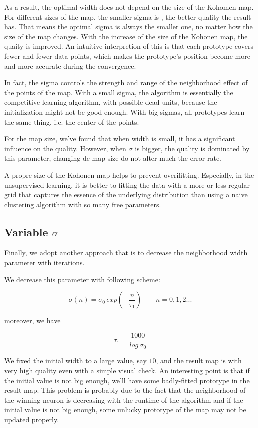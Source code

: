 \documentclass[a4paper, 12pt]{article}
\begin{document}
As a result, the optimal width does not depend on the size of the
Kohomen map. For different sizes of the map, the smaller sigma is ,
the better quality the result has. That means the optimal sigma is
always the smaller one, no matter how the size of the map
changes. With the increase of the size of the Kohonen map, the quaity
is improved. An intuitive interpretion of this is that each prototype
covers fewer and fewer data points, which makes the prototype's
position become more and more accurate during the convergence.

In fact, the sigma controls the strength and range of the neighborhood effect of the points of the map. With a small sigma, the algorithm is essentially the competitive learning algorithm, with possible dead units, because the initialization might not be good enough. With big sigmas, all prototypes learn the same thing, i.e. the center of the points.

For the map size, we've found that when width is small, it has a
significant influence on the quality. However, when $\sigma$ is
bigger, the quality is dominated by this parameter, changing de map
size do not alter much the error rate.

A propre size of the Kohonen map helps to prevent overifitting. Especially, in the unsupervised learning, it is better to fitting the data with a more or less regular grid that captures the essence of the underlying distribution than using a naive clustering algorithm with so many free parameters.

\subsection{Variable $\sigma$}

Finally, we adopt another approach that is to decrease the
neighborhood width parameter with iterations.

We decrease this parameter with following scheme:

\begin{equation}
  \sigma (n) = \sigma _0 \, exp(-\frac{n}{\tau _1}) \qquad n = 0, 1, 2 ...
\end{equation}

moreover, we have

\begin{equation}
  \tau _1 = \frac{1000}{log \, \sigma _0}
\end{equation}

We fixed the initial width to a large value, say $10$, and the result
map is with very high quality even with a simple visual check. An
interesting point is that if the initial value is not big enough,
we'll have some badly-fitted prototype in the result map. This problem
is probably due to the fact that the neighborhood of the winning
neuron is decreasing with the runtime of the algorithm and if the
initial value is not big enough, some unlucky prototype of the map may
not be updated properly.
\end{document}
